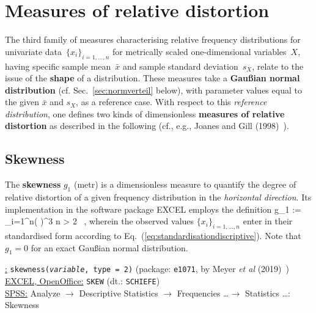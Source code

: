 \section[Measures of relative distortion]{Measures of relative
distortion}
The third family of measures characterising relative frequency 
distributions for univariate data~$\{x_{i}\}_{i=1,\ldots,n}$ for 
metrically scaled one-dimensional variables~$X$, having specific 
sample mean~$\bar{x}$ and sample standard deviation~$s_{X}$, 
relate to the issue of the \textbf{shape} of a distribution. These 
measures take a \textbf{Gau\ss ian normal distribution} (cf. 
Sec.~\ref{sec:normverteil} below), with parameter values equal 
to the given $\bar{x}$ and $s_{X}$, as a reference case. With 
respect to this \textit{reference distribution}, one defines two 
kinds of dimensionless \textbf{measures of relative distortion} as 
described in the following (cf., e.g., Joanes and Gill 
(1998)~).

\subsection[Skewness]{Skewness}
The \textbf{skewness} $g_{1}$ (metr) is a dimensionless measure to 
quantify the degree of relative distortion of a given frequency
distribution in the \textit{horizontal direction}. Its 
implementation in the software package EXCEL employs the definition
%
\be
{}
g_{1} := 
\sum_{i=1}^{n}\left(
\right)^{3}
\qquad{}\quad n > 2 \ ,
\ee
%
wherein the observed values $\{x_{i}\}_{i=1,\ldots,n}$ enter in 
their standardised form according to 
Eq.~(\ref{eq:standardisationdiscriptive}). Note that $g_{1}=0$ for 
an exact Gau\ss ian normal distribution.

\medskip
\noindent
\underline{\R:} \texttt{skewness(\textit{variable},
type = 2)} (package: \texttt{e1071}, by Meyer \textit{et al}
(2019)~) \\
\underline{EXCEL, OpenOffice:} \texttt{SKEW} (dt.:
\texttt{SCHIEFE}) \\
\underline{SPSS:} Analyze $\rightarrow$ Descriptive Statistics
$\rightarrow$ Frequencies \ldots $\rightarrow$ Statistics
\ldots: Skewness

